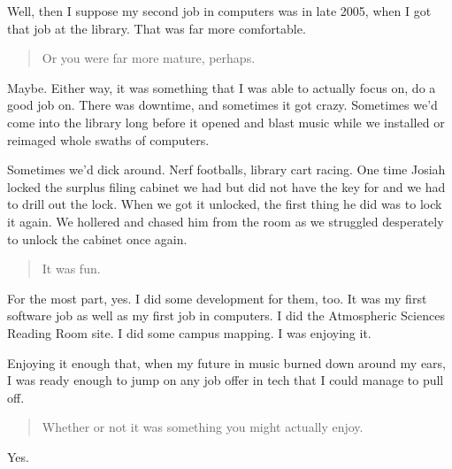 Well, then I suppose my second job in computers was in late 2005, when I got that job at the library. That was far more comfortable.

\begin{quote}
Or you were far more mature, perhaps.
\end{quote}

Maybe. Either way, it was something that I was able to actually focus on, do a good job on. There was downtime, and sometimes it got crazy. Sometimes we'd come into the library long before it opened and blast music while we installed or reimaged whole swaths of computers.

Sometimes we'd dick around. Nerf footballs, library cart racing. One time Josiah locked the surplus filing cabinet we had but did not have the key for and we had to drill out the lock. When we got it unlocked, the first thing he did was to lock it again. We hollered and chased him from the room as we struggled desperately to unlock the cabinet once again.

\begin{quote}
It was fun.
\end{quote}

For the most part, yes. I did some development for them, too. It was my first software job as well as my first job in computers. I did the Atmospheric Sciences Reading Room site. I did some campus mapping. I was enjoying it.

Enjoying it enough that, when my future in music burned down around my ears, I was ready enough to jump on any job offer in tech that I could manage to pull off.

\begin{quote}
Whether or not it was something you might actually enjoy.
\end{quote}

Yes.
